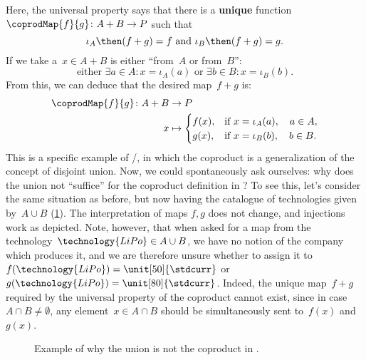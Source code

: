 \begin{example}
  Here, the universal property says that there is a \textbf{unique} function~$\coprodMap{f}{g}\colon A+B\to P$ such that
  \begin{equation*}
    \iota_A\then (f+ g)=f \text{ and }\iota_B\then (f+ g)=g.
  \end{equation*}
  If we take a~$x\in A+B$ is either ``from~$A$ or from~$B$'':
  \begin{equation*}
    \text{either } \exists a\in A:x=\iota_A(a) \text{ or }\exists b\in B:x=\iota_B(b).
  \end{equation*}
  From this, we can deduce that the desired map~$f+g$ is:
  \begin{equation*}
    \begin{aligned}
      \coprodMap{f}{g} \colon  A + B &\to P \\
      x &   \mapsto
      \begin{cases}
        f(x),& \text{if } x=\iota_A(a),\quad a \in A, \\
        g(x),& \text{if } x=\iota_B(b),\quad b \in B.
      \end{cases}
    \end{aligned}
  \end{equation*}
  This is a specific example of \Set/\FinSet, in which the coproduct is a generalization of the concept of disjoint union. Now, we could spontaneously ask ourselves: why does the union not ``suffice'' for the coproduct definition in \Set? To see this, let's consider the same situation as before, but now having the catalogue of technologies given by~$A\cup B$ (\cref{fig:coprod_batteries_2}). The interpretation of maps $f,g$ does not change, and injections work as depicted. Note, however, that when asked for a map from the technology~$\technology{LiPo}\in A\cup B$, we have no notion of the company which produces it, and we are therefore unsure whether to assign it to~$f(\technology{LiPo})=\unit[50]{\stdcurr}$ or~$g(\technology{LiPo})=\unit[80]{\stdcurr}$. Indeed, the unique map~$f+g$ required by the universal property of the coproduct cannot exist, since in case~$A\cap B\neq \emptyset$, any element~$x\in A\cap B$ should be simultaneously sent to~$f(x)$ and~$g(x)$.

  \begin{figure}[h!]
    \centering
    \caption{Example of why the union is not the coproduct in \Set.}
    \label{fig:coprod_batteries_2}
  \end{figure}
\end{example}


